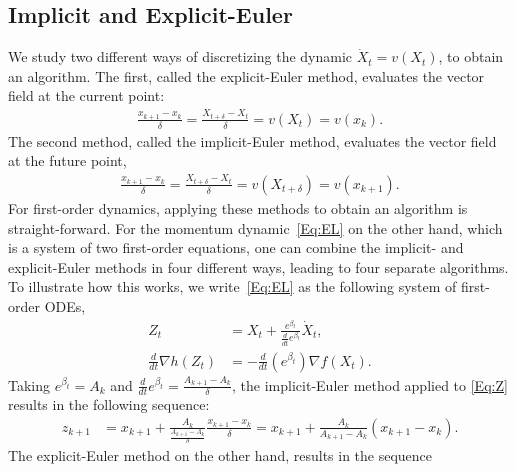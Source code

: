 \documentclass[11pt]{article}
\theoremstyle{plain}
\begin{document}
 \subsection{Implicit and Explicit-Euler}
We study two different ways of discretizing the dynamic $ \dot X_t = v(X_t)$, to obtain an algorithm. The first, called the explicit-Euler method, evaluates the vector field at the current point:
\begin{align*}
\frac{x_{k+1} - x_k}{\delta} = \frac{X_{t+ \delta} - X_t}{\delta}= v(X_t) = v(x_k).
\end{align*}
The second method, called the implicit-Euler method, evaluates the vector field at the future point,
\begin{align*}
\frac{x_{k+1} - x_k}{\delta} = \frac{X_{t+ \delta} - X_t}{\delta}= v(X_{t+\delta}) = v(x_{k+1}).
\end{align*}
For first-order dynamics, applying these methods to obtain an algorithm is straight-forward. For the momentum dynamic~\eqref{Eq:EL} on the other hand, which is a system of two first-order equations, one can combine the implicit- and explicit-Euler methods in four different ways, leading to four separate algorithms. To illustrate how this works, we write~\eqref{Eq:EL} as the following system of first-order ODEs,
 \begin{subequations}\label{Eq:DynaBeta}
 \begin{align}
 Z_t &= X_t + \frac{e^{\beta_t}}{\frac{d}{dt} e^{\beta_t}} \dot X_t, \label{Eq:Z}\\
 \frac{d}{dt} \nabla h(Z_t) &= -\frac{d}{dt}\left(e^{\beta_t}\right) \nabla f(X_t). \label{Eq:X}
 \end{align}
 \end{subequations}
 Taking $e^{\beta_t} = A_k$ and $\frac{d}{dt}e^{\beta_t} =\frac{A_{k+1} - A_k}{\delta}$, the implicit-Euler method applied to \eqref{Eq:Z} results in the following sequence:
 \begin{align*}
 z_{k+1} &= x_{k+1} + \frac{A_k}{\frac{A_{k+1} - A_k}{\delta}} \frac{x_{k+1} - x_k}{\delta}=  x_{k+1} + \frac{A_k}{A_{k+1} - A_k} (x_{k+1} - x_k).
 \end{align*}
The explicit-Euler method on the other hand, results in the sequence 
\end{document}
